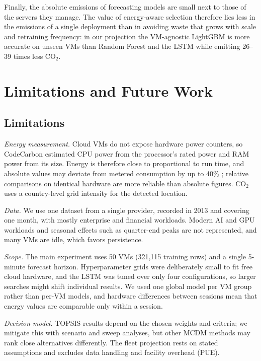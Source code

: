 \documentclass[conference,letterpaper,10pt]{IEEEtran}
\begin{document}
Finally, the absolute emissions of forecasting models are small next to those of the servers they manage. The value of energy-aware selection therefore lies less in the emissions of a single deployment than in avoiding waste that grows with scale and retraining frequency: in our projection the VM-agnostic LightGBM is more accurate on unseen VMs than Random Forest and the LSTM while emitting 26--39 times less CO$_2$.

\section{Limitations and Future Work}
\label{sec:limitations}

\subsection{Limitations}
\textit{Energy measurement.} Cloud VMs do not expose hardware power counters, so CodeCarbon estimated CPU power from the processor's rated power and RAM power from its size. Energy is therefore close to proportional to run time, and absolute values may deviate from metered consumption by up to 40\% \cite{fischer2025groundtruth}; relative comparisons on identical hardware are more reliable than absolute figures. CO$_2$ uses a country-level grid intensity for the detected location.

\textit{Data.} We use one dataset from a single provider, recorded in 2013 and covering one month, with mostly enterprise and financial workloads. Modern AI and GPU workloads and seasonal effects such as quarter-end peaks are not represented, and many VMs are idle, which favors persistence.

\textit{Scope.} The main experiment uses 50 VMs (321{,}115 training rows) and a single 5-minute forecast horizon. Hyperparameter grids were deliberately small to fit free cloud hardware, and the LSTM was tuned over only four configurations, so larger searches might shift individual results. We used one global model per VM group rather than per-VM models, and hardware differences between sessions mean that energy values are comparable only within a session.

\textit{Decision model.} TOPSIS results depend on the chosen weights and criteria; we mitigate this with scenario and sweep analyses, but other MCDM methods may rank close alternatives differently. The fleet projection rests on stated assumptions and excludes data handling and facility overhead (PUE).
\end{document}
